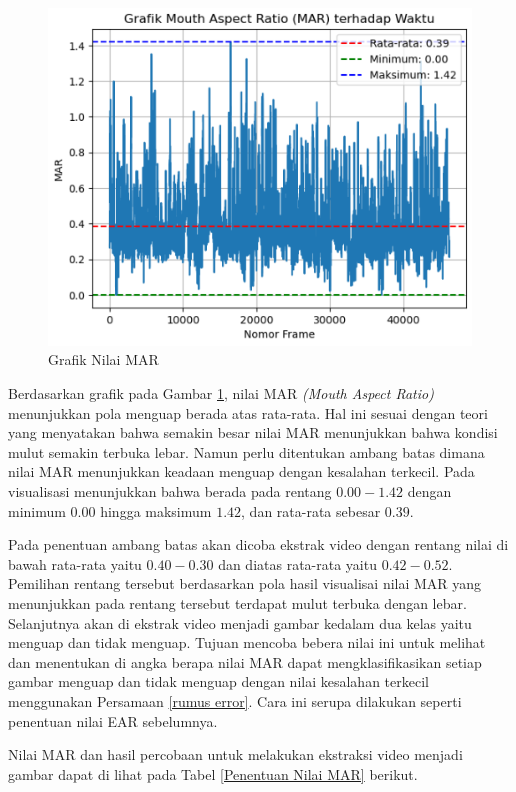     
             \begin{figure}[H]
                 \centering
                 \includegraphics[width=0.8\linewidth]{figures/bab4/nilai mar.png}
                 \caption{Grafik Nilai MAR}
                 \label{Grafik Nilai MAR}
             \end{figure}



        
            Berdasarkan grafik pada Gambar \ref{Grafik Nilai MAR}, nilai MAR \textit{(Mouth Aspect Ratio)} menunjukkan pola menguap berada atas rata-rata. Hal ini sesuai dengan teori yang menyatakan bahwa semakin besar nilai MAR menunjukkan bahwa kondisi mulut semakin terbuka lebar. Namun perlu ditentukan ambang batas dimana nilai MAR menunjukkan keadaan menguap dengan kesalahan terkecil. Pada visualisasi menunjukkan bahwa berada pada rentang $0.00 - 1.42$ dengan minimum $0.00$ hingga maksimum $1.42$, dan rata-rata sebesar $0.39$. 
            
            Pada penentuan ambang batas akan dicoba ekstrak video dengan rentang nilai di bawah rata-rata yaitu $0.40 - 0.30$ dan diatas rata-rata yaitu $0.42 - 0.52$. Pemilihan rentang tersebut berdasarkan pola hasil visualisai nilai MAR yang menunjukkan pada rentang tersebut terdapat mulut terbuka dengan lebar. Selanjutnya akan di ekstrak video menjadi gambar kedalam dua kelas yaitu menguap dan tidak menguap. Tujuan mencoba bebera nilai ini untuk 
            melihat dan menentukan di angka berapa nilai MAR dapat mengklasifikasikan setiap gambar menguap dan tidak menguap dengan nilai kesalahan terkecil menggunakan Persamaan \ref{rumus error}. Cara ini serupa dilakukan seperti penentuan nilai EAR sebelumnya.
            
            Nilai MAR dan hasil percobaan untuk melakukan ekstraksi video menjadi gambar dapat di lihat pada Tabel \ref{Penentuan Nilai MAR} berikut.\\


